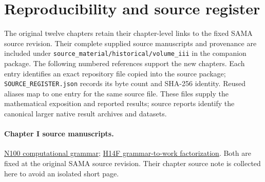 \clearpage\onecolumn
{}
\section*{Reproducibility and source register}
The original twelve chapters retain their chapter-level links to the fixed SAMA source revision. Their complete supplied source manuscripts and provenance are included under \texttt{source\_material/historical/volume\_iii} in the companion package. The following numbered references support the new chapters. Each entry identifies an exact repository file copied into the source package; \texttt{SOURCE\_REGISTER.json} records its byte count and SHA-256 identity. Reused aliases map to one entry for the same source file. These files supply the mathematical exposition and reported results; source reports identify the canonical larger native result archives and datasets.

\paragraph{Chapter I source manuscripts.}\label{viii-ch01-sources-and-evidential-scope}
\href{https://github.com/iwtbotiwtwot/SAMA/blob/4c2b5dc1649da5900c90b90d0ce56c223dbb7717/vol_iii/01-grammar-and-language/n100-computational-grammar.md}{N100 computational grammar}; \href{https://github.com/iwtbotiwtwot/SAMA/blob/4c2b5dc1649da5900c90b90d0ce56c223dbb7717/vol_iii/02-slc/h14f-grammar-to-work-factorization.md}{H14F grammar-to-work factorization}. Both are fixed at the original SAMA source revision. Their chapter source note is collected here to avoid an isolated short page.


